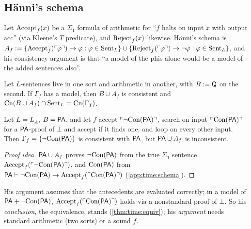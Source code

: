 \subsection{H\"anni's schema}\label{sec:time:schema}

Let $\mathrm{Accept}_{f}(x)$ be a $\Sigma_1$ formula of arithmetic for ``$f$ halts on input $x$ with output $\mathrm{acc}$'' (via Kleene's $T$ predicate), and $\mathrm{Reject}_{f}(x)$ likewise. H\"anni's schema is
$A_f:=\{\mathrm{Accept}_{f}(\ulcorner \varphi\urcorner)\to\varphi:\varphi\in\mathrm{Sent}_L\}\cup\{\mathrm{Reject}_{f}(\ulcorner \varphi\urcorner)\to\neg\varphi:\varphi\in\mathrm{Sent}_L\}$, and his consistency argument is that ``a model of the phis alone would be a model of the added sentences also''.

\begin{proposition}\label{prop:time:twosorted}
Let $L$-sentences live in one sort and arithmetic in another, with $B:=\mathsf{Q}$ on the second. If $\Gamma_f$ has a model, then $B\cup A_f$ is consistent and $\mathrm{Cn}(B\cup A_f)\cap\mathrm{Sent}_L=\mathrm{Cn}(\Gamma_f)$.
\end{proposition}

\begin{proposition}\label{prop:time:single}
Let $L=L_A$, $B=\mathsf{PA}$, and let $f$ accept $\ulcorner \neg\mathrm{Con}(\mathsf{PA})\urcorner$, search on input $\ulcorner \mathrm{Con}(\mathsf{PA})\urcorner$ for a $\mathsf{PA}$-proof of $\bot$ and accept if it finds one, and loop on every other input. Then $\Gamma_f=\{\neg\mathrm{Con}(\mathsf{PA})\}$ is consistent with $\mathsf{PA}$, but $\mathsf{PA}\cup A_f$ is inconsistent.
\end{proposition}

\begin{proof}[Proof idea]
$\mathsf{PA}\cup A_f$ proves $\neg\mathrm{Con}(\mathsf{PA})$ from the true $\Sigma_1$ sentence $\mathrm{Accept}_{f}(\ulcorner \neg\mathrm{Con}(\mathsf{PA})\urcorner)$, and $\mathrm{Con}(\mathsf{PA})$ from $\mathsf{PA}\vdash\neg\mathrm{Con}(\mathsf{PA})\to\mathrm{Accept}_{f}(\ulcorner \mathrm{Con}(\mathsf{PA})\urcorner)$ (\cref{app:time:schema}).
\end{proof}

His argument assumes that the antecedents are evaluated correctly; in a model of $\mathsf{PA}+\neg\mathrm{Con}(\mathsf{PA})$, $\mathrm{Accept}_{f}(\ulcorner \mathrm{Con}(\mathsf{PA})\urcorner)$ holds via a nonstandard proof of $\bot$. So his \emph{conclusion}, the equivalence, stands (\cref{thm:time:equiv}); his \emph{argument} needs standard arithmetic (two sorts) or a sound $f$.


